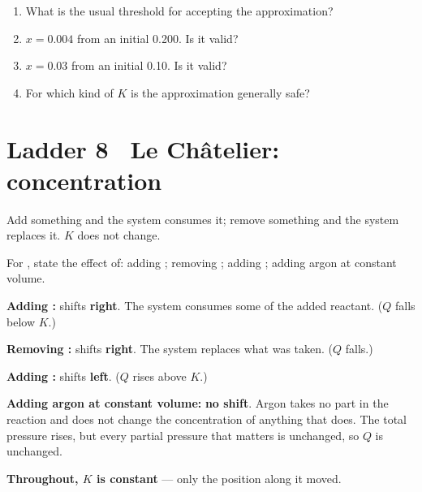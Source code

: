 \documentclass{apchem-worksheet}
\begin{document}
\begin{yourturn}
\begin{enumerate}[leftmargin=*,itemsep=0.5em]
  \item What is the usual threshold for accepting the approximation?
        \workspace[1.4cm]
  \item $x = 0.004$ from an initial \SI{0.200}{\Molar}. Is it valid?
        \workspace[1.6cm]
  \item $x = 0.03$ from an initial \SI{0.10}{\Molar}. Is it valid?
        \workspace[1.6cm]
  \item For which kind of $K$ is the approximation generally safe?
        \workspace[1.6cm]
\end{enumerate}
\end{yourturn}

\section*{\sffamily Ladder 8 \textbullet\ Le Ch\^{a}telier: concentration}
 

Add something and the system consumes it; remove something and the system
replaces it. $K$ does not change.

\begin{workedexample}
For , state the effect of: adding ; removing
; adding ; adding argon at constant volume.

\textbf{Adding :} shifts \textbf{right}. The system consumes some
of the added reactant. ($Q$ falls below $K$.)

\textbf{Removing :} shifts \textbf{right}. The system replaces
what was taken. ($Q$ falls.)

\textbf{Adding :} shifts \textbf{left}. ($Q$ rises above $K$.)

\textbf{Adding argon at constant volume:} \textbf{no shift}. Argon takes
no part in the reaction and does not change the concentration of anything
that does. The total pressure rises, but every partial pressure that
matters is unchanged, so $Q$ is unchanged.

\textbf{Throughout, $K$ is constant} --- only the position along it moved.
\end{workedexample}
\end{document}
